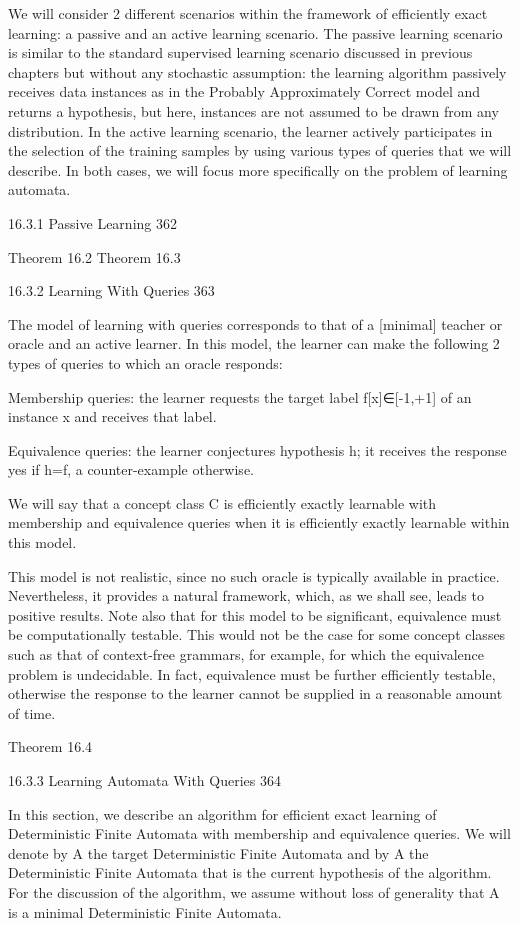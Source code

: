 We will consider 2 different scenarios within the framework of efficiently exact learning: a passive and an active learning scenario. The passive learning scenario is similar to the standard supervised learning scenario discussed in previous chapters but without any stochastic assumption: the learning algorithm passively receives data instances as in the Probably Approximately Correct model and returns a hypothesis, but here, instances are not assumed to be drawn from any distribution. In the active learning scenario, the learner actively participates in the selection of the training samples by using various types of queries that we will describe. In both cases, we will focus more specifically on the problem of learning automata.


16.3.1 Passive Learning 362

Theorem 16.2
Theorem 16.3

16.3.2 Learning With Queries 363

The model of learning with queries corresponds to that of a [minimal] teacher or oracle and an active learner. In this model, the learner can make the following 2 types of queries to which an oracle responds:

Membership queries: the learner requests the target label f[x]∈[-1,+1] of an instance x and receives that label.

Equivalence queries: the learner conjectures hypothesis h; it receives the response yes if h=f, a counter-example otherwise.

We will say that a concept class C is efficiently exactly learnable with membership and equivalence queries when it is efficiently exactly learnable within this model.

This model is not realistic, since no such oracle is typically available in practice. Nevertheless, it provides a natural framework, which, as we shall see, leads to positive results. Note also that for this model to be significant, equivalence must be computationally testable. This would not be the case for some concept classes such as that of context-free grammars, for example, for which the equivalence problem is undecidable. In fact, equivalence must be further efficiently testable, otherwise the response to the learner cannot be supplied in a reasonable amount of time.

Theorem 16.4

16.3.3 Learning Automata With Queries 364

In this section, we describe an algorithm for efficient exact learning of Deterministic Finite Automata with membership and equivalence queries. We will denote by A the target Deterministic Finite Automata and by A the Deterministic Finite Automata that is the current hypothesis of the algorithm. For the discussion of the algorithm, we assume without loss of generality that A is a minimal Deterministic Finite Automata.

